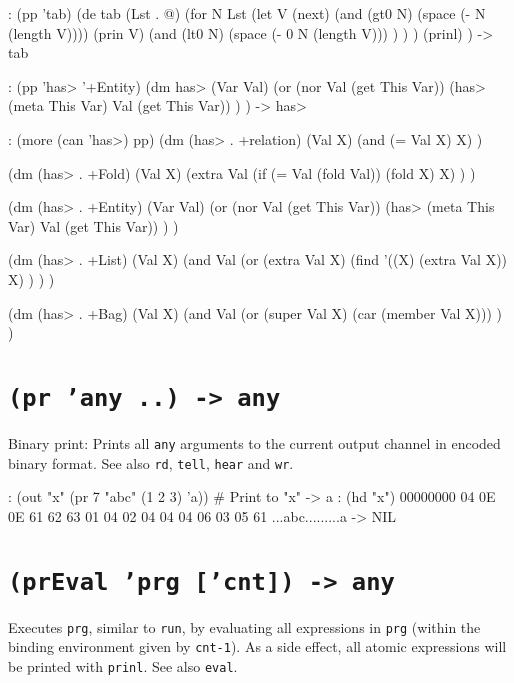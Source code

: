 \begin{wideverbatim}
: (pp 'tab)
(de tab (Lst . @)
   (for N Lst
      (let V (next)
         (and (gt0 N) (space (- N (length V))))
         (prin V)
         (and
            (lt0 N)
            (space (- 0 N (length V))) ) ) )
   (prinl) )
-> tab

: (pp 'has> '+Entity)
(dm has> (Var Val)
   (or
      (nor Val (get This Var))
      (has> (meta This Var) Val (get This Var)) ) )
-> has>

: (more (can 'has>) pp)
(dm (has> . +relation) (Val X)
   (and (= Val X) X) )

(dm (has> . +Fold) (Val X)
   (extra
      Val
      (if (= Val (fold Val)) (fold X) X) ) )

(dm (has> . +Entity) (Var Val)
   (or
      (nor Val (get This Var))
      (has> (meta This Var) Val (get This Var)) ) )

(dm (has> . +List) (Val X)
   (and
      Val
      (or
         (extra Val X)
         (find '((X) (extra Val X)) X) ) ) )

(dm (has> . +Bag) (Val X)
   (and
      Val
      (or (super Val X) (car (member Val X))) ) )
\end{wideverbatim}

 
\section*{\texttt{(pr 'any ..) -> any}}
\label{sec:func-ref-P-(pr 'any ..) -> any}


Binary print: Prints all \texttt{any} arguments to the current output channel
in encoded binary format. See also \texttt{rd}, \texttt{tell}, \texttt{hear} and \texttt{wr}.


\begin{wideverbatim}
: (out "x" (pr 7 "abc" (1 2 3) 'a))  # Print to "x"
-> a
: (hd "x")
00000000  04 0E 0E 61 62 63 01 04 02 04 04 04 06 03 05 61  ...abc.........a
-> NIL
\end{wideverbatim}

 
\section*{\texttt{(prEval 'prg ['cnt]) -> any}}
\label{sec:func-ref-P-(prEval 'prg ['cnt]) -> any}


Executes \texttt{prg}, similar to \texttt{run}, by evaluating all expressions in \texttt{prg}
(within the binding environment given by \texttt{cnt-1}). As a side effect, all
atomic expressions will be printed with \texttt{prinl}. See also \texttt{eval}.


